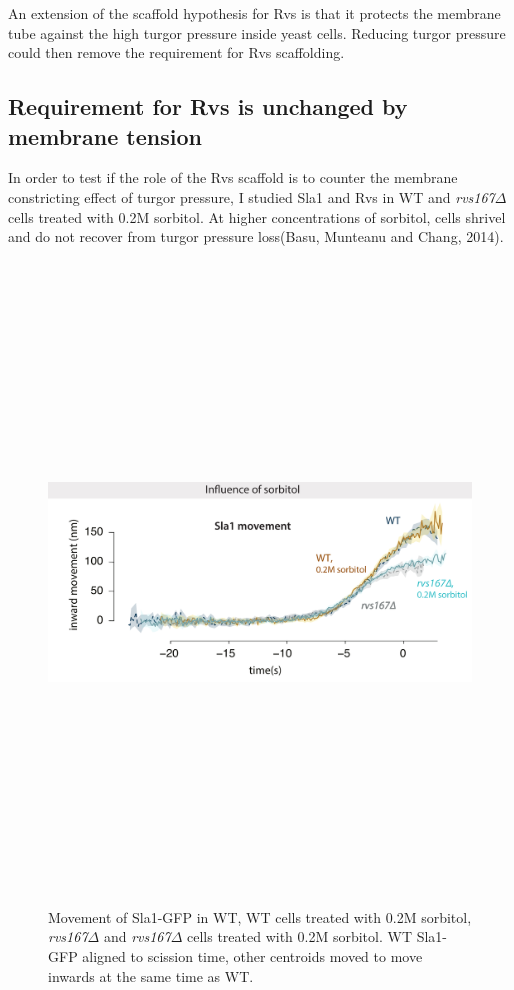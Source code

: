 An extension of the scaffold hypothesis for Rvs is that it protects the membrane tube against the high turgor pressure inside yeast cells. Reducing turgor pressure could then remove the requirement for Rvs scaffolding.

	\subsection{Requirement for Rvs is unchanged by membrane tension}

	In order to test if the role of the Rvs scaffold is to counter the membrane constricting effect of turgor pressure, I studied Sla1 and Rvs in WT and \textit{rvs167$\Delta$} cells treated with 0.2M sorbitol. At higher concentrations of sorbitol, cells shrivel and do not recover from turgor pressure loss(Basu, Munteanu and Chang, 2014).

	
		\begin{figure}[H]
		\centering
		\includegraphics[width=15cm,height=17cm,keepaspectratio]{figures/results_final/sorbitol2}
		\caption[Effect of sorbitol on \textit{rvs167$\Delta$} cells]
		{Movement of Sla1-GFP in WT, WT cells treated with 0.2M sorbitol, \textit{rvs167$\Delta$} and \textit{rvs167$\Delta$} cells treated with 0.2M sorbitol. WT Sla1-GFP aligned to scission time, other centroids moved to move inwards at the same time as WT.
			\label{fig_sorbitol}}
		
	\end{figure}

